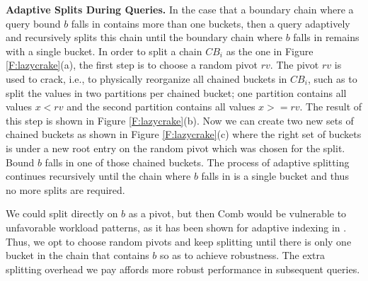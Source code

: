 \textbf{Adaptive Splits During Queries.}
In the case that a boundary chain where a query bound $b$ falls in contains more than one buckets, then 
a query adaptively and recursively splits this chain until the boundary chain where $b$ falls in 
remains with a single bucket.  
In order to split a chain $CB_i$ as the one in Figure \ref{F:lazycrake}(a), 
the first step is to choose a random pivot $rv$. 
The pivot $rv$ is used to crack, i.e., to physically reorganize all chained
buckets in $CB_i$, such as to split the values in two partitions per chained bucket; 
one partition contains all values $x<rv$ and the second partition contains all values $x>=rv$.
The result of this step is shown in Figure \ref{F:lazycrake}(b).
Now we can create two new sets of chained buckets as shown in Figure \ref{F:lazycrake}(c) where the right set
of buckets is under a new root entry on the random pivot which was chosen for the split.
Bound $b$ falls in one of those chained buckets. The process of adaptive splitting continues recursively
until the chain where $b$ falls in is a single bucket and thus no more splits are required.

We could split directly on $b$ as a pivot, 
but then Comb would be vulnerable to unfavorable workload patterns, as it has been shown for adaptive indexing in \cite{StochasticCracking}. 
Thus, we opt to choose random pivots and keep splitting until there is only one bucket in the 
chain that contains $b$ so as to achieve robustness. 
The extra splitting overhead we pay affords more robust performance in subsequent queries.







